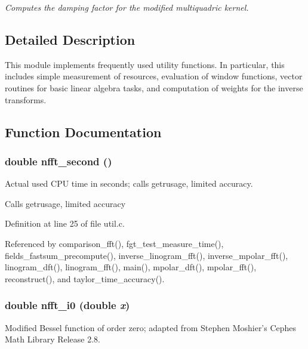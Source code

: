 \begin{CompactItemize}
\begin{CompactList}\small\item\em Computes the damping factor for the modified multiquadric kernel. \item\end{CompactList}\end{CompactItemize}


\subsection{Detailed Description}
This module implements frequently used utility functions. In particular, this includes simple measurement of resources, evaluation of window functions, vector routines for basic linear algebra tasks, and computation of weights for the inverse transforms. 

\subsection{Function Documentation}
\hypertarget{group__nfftutil_ga0}{
\subsubsection[nfft\_\-second]{\setlength{\rightskip}{0pt plus 5cm}double nfft\_\-second ()}}
\label{group__nfftutil_ga0}


Actual used CPU time in seconds; calls getrusage, limited accuracy. 

Calls getrusage, limited accuracy 

Definition at line 25 of file util.c.

Referenced by comparison\_\-fft(), fgt\_\-test\_\-measure\_\-time(), fields\_\-fastsum\_\-precompute(), inverse\_\-linogram\_\-fft(), inverse\_\-mpolar\_\-fft(), linogram\_\-dft(), linogram\_\-fft(), main(), mpolar\_\-dft(), mpolar\_\-fft(), reconstruct(), and taylor\_\-time\_\-accuracy().\hypertarget{group__nfftutil_ga9}{
\subsubsection[nfft\_\-i0]{\setlength{\rightskip}{0pt plus 5cm}double nfft\_\-i0 (double {\em x})}}
\label{group__nfftutil_ga9}


Modified Bessel function of order zero; adapted from Stephen Moshier's Cephes Math Library Release 2.8. 

